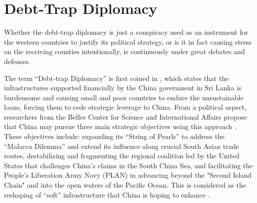 \section*{Debt-Trap Diplomacy}
Whether the debt-trap diplomacy is just a conspiracy used as an instrument for the western countries to justify its political strategy, or is it in fact causing stress on the receiving counties intentionally, is continuously under great debates and defenses.

The term ``Debt-trap Diplomacy'' is first coined in \citet{Chellaney_2017}, which states that the infrastructures supported financially by the China government in Sri Lanka is burdensome and causing small and poor countries to endure the unsustainable loans, forcing them to cede strategic leverage to China.
From a political aspect,
researchers from the Belfer Center for Science and International Affairs propose that China may pursue three main strategic objectives using this approach \citep*{Parker2018}.
These objectives include: expanding its ``String of Pearls'' to address the ``Malacca Dilemma\footnotemark{}'' and extend its influence along crucial South Asian trade routes, destabilizing and fragmenting the regional coalition led by the United States that challenges China's claims in the South China Sea, and facilitating the People's Liberation Army Navy (PLAN) in advancing beyond the "Second Island Chain" and into the open waters of the Pacific Ocean.
This is considered as the reshaping of ``soft'' infrastructure that China is hoping to enhance \citep{Jonathan-Hillman-18}.

